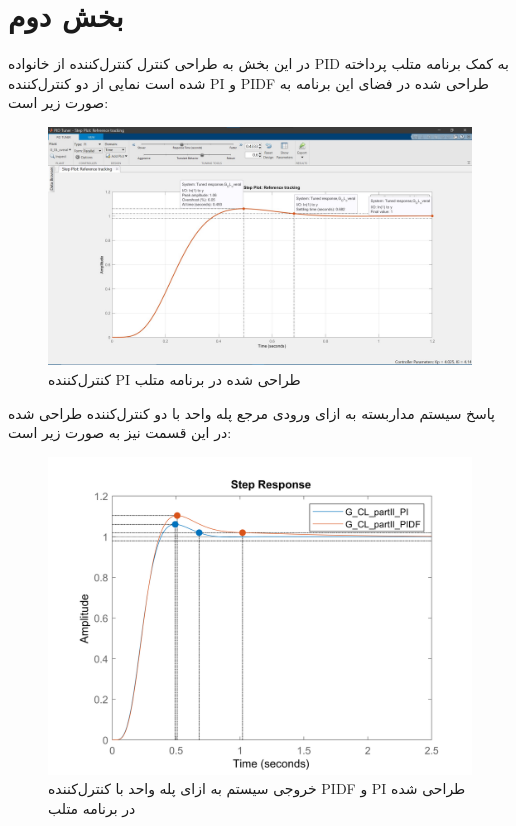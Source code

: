 \chapter{بخش دوم}\label{part_II}
در این بخش به طراحی کنترل کنترل‌کننده از خانواده  PID به کمک برنامه   متلب پرداخته شده است نمایی از دو کنترل‌کننده PI  و PIDF طراحی شده در فضای این برنامه به صورت زیر است:
\begin{figure}[H]
	\centering
	\includegraphics[width=12cm]{../Figure/P_II/controller_PIDtuner__partII_PI.jpg}
	\caption{کنترل‌کننده PI طراحی شده در برنامه  متلب}
\end{figure}


پاسخ سیستم مداربسته به ازای ورودی مرجع پله واحد با دو کنترل‌کننده طراحی شده در این قسمت نیز به صورت زیر است:
\begin{figure}[H]
	\centering
	\includegraphics[width=12cm]{../Figure/P_II/PID_tunner.png}
	\caption{خروجی سیستم به ازای پله واحد با کنترل‌کننده PIDF و PI طراحی شده در برنامه  متلب}
\end{figure}


